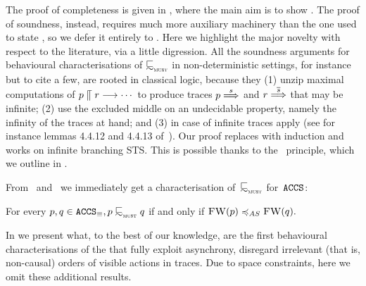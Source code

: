 The proof of completeness is given in ,
where the main aim is to show .
The proof of soundness, instead, requires much more
auxiliary machinery than the one used to state ,
so we defer it entirely to .
Here we highlight the major novelty with respect to the literature, via a little digression.
All the soundness arguments for behavioural characterisations of
$\testleqS$ in non-deterministic settings,
for instance~\cite{DBLP:journals/tcs/NicolaH84,DBLP:journals/jlp/Hennessy05,DBLP:journals/fac/HennessyI93,DBLP:journals/iandc/BorealeN95,DBLP:journals/corr/BernardiH15}
but to cite a few, are rooted in classical logic, because they
(1) unzip %
maximal computations of 
$p  \mathrel{\llceil}  r\mathrel{\overset{}\longrightarrow}\cdots$  %
to produce traces $ p \mathrel{\overset{ s } \Longrightarrow} $ and $ r
\mathrel{\overset{ \overline{ s } } \Longrightarrow} $ that may be infinite;
(2) use the excluded middle on an undecidable property,
namely the infinity of the traces at hand; and 
(3) in case of infinite traces apply \koenigslemma
(see for instance lemmas 4.4.12 and 4.4.13 of~\cite{DBLP:books/daglib/0066919}).
Our proof replaces \koenigslemma with induction and works
on infinite branching STS. This is possible thanks to the \barinduction\ principle,
which we outline in .


From~ and~ we
immediately get a characterisation of~$\testleqS$ for~$\texttt{ACCS}$:
\begin{corollary}
  \label{cor:characterisation-for-aCCS}
For every $\serverA, \serverB \in \modulo{\ACCS}{\equiv}, \serverA \testleqS \serverB$ if and only if $\liftFW{\serverA} \asleq
\liftFW{\serverB}.$
\end{corollary}

In  we present what, to the best of our knowledge,
are the first behavioural characterisations of the \mustpreorder that
fully exploit asynchrony, \ie disregard irrelevant (that is, non-causal)
orders of visible actions in traces. Due to space constraints, here
we omit these additional results.





